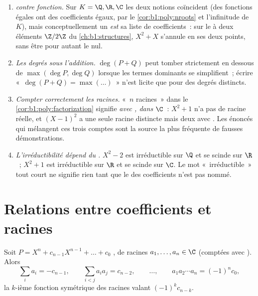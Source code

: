 \begin{remark}\label{rem:b1:poly:pitfalls}
\begin{enumerate}
  \item \emph{ contre fonction.} Sur $K = \Q, \R, \C$ les
        deux notions coïncident (des fonctions égales ont des
        coefficients égaux, par le \cref{cor:b1:poly:nroots} et
        l'infinitude de $K$), mais conceptuellement un 
        \emph{est} sa liste de coefficients~: sur le  à deux
        éléments $\Z/2\Z$ du \cref{ch:b1:structures}, $X^2 + X$
        s'annule en ses deux points, sans être pour autant le
         nul.
  \item \emph{Les degrés sous l'addition.} $\deg(P + Q)$ peut
        tomber strictement en dessous de $\max(\deg P, \deg Q)$
        lorsque les termes dominants se simplifient~; écrire
        «~$\deg(P + Q) = \max(\dots)$~» n'est licite que pour des
        degrés distincts.
  \item \emph{Compter correctement les racines.} «~$n$ racines~»
        dans le \cref{cor:b1:poly:factorization} signifie \emph{avec
        , dans $\C$}~: $X^2 + 1$ n'a pas de racine
        réelle, et $(X-1)^2$ a une seule racine distincte mais deux
        avec . Les énoncés qui mélangent ces trois
        comptes sont la source la plus fréquente de fausses
        démonstrations.
  \item \emph{L'irréductibilité dépend du .} $X^2 - 2$ est
        irréductible sur $\Q$ et se scinde sur $\R$~; $X^2 + 1$ est
        irréductible sur $\R$ et se scinde sur $\C$. Le mot
        «~irréductible~» tout court ne signifie rien tant que le
         des coefficients n'est pas nommé.
\end{enumerate}
\end{remark}

\section{Relations entre coefficients et racines}

\begin{theorem}\label{thm:b1:poly:vieta}
Soit $P = X^n + c_{n-1} X^{n-1} + \dots + c_0$ , de racines
$a_1, \dots, a_n \in \C$ (comptées avec ).
Alors
\[
\sum_i a_i = -c_{n-1},
\qquad
\sum_{i < j} a_i a_j = c_{n-2},
\qquad \dots, \qquad
a_1 a_2 \cdots a_n = (-1)^n c_0 ,
\]
la $k$-ième fonction symétrique des racines valant $(-1)^k c_{n-k}$.
\end{theorem}

